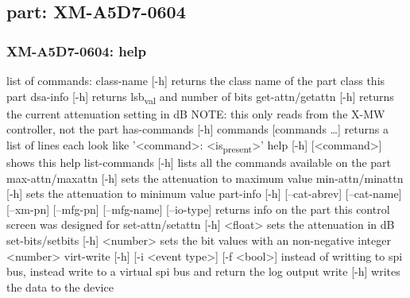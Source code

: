 \documentclass[11pt]{article}
\begin{document}
\subsection{part: XM-A5D7-0604}
\label{sec:orge544753}
\subsubsection{XM-A5D7-0604: help}
\label{sec:org00f37d2}
list of commands:
  class-name [-h]
    returns the class name of the part class this part
  dsa-info [-h]
    returns lsb\textsubscript{val} and number of bits
  get-attn/getattn [-h]
    returns the current attenuation setting in dB
    NOTE: this only reads from the X-MW controller, not the part
  has-commands [-h] commands [commands \ldots{}]
    returns a list of lines each look like '<command>: <is\textsubscript{present}>'
  help [-h] [<command>]
    shows this help
  list-commands [-h]
    lists all the commands available on the part
  max-attn/maxattn [-h]
    sets the attenuation to maximum value
  min-attn/minattn [-h]
    sets the attenuation to minimum value
  part-info  [-h] [--cat-abrev] [--cat-name] [--xm-pn] [--mfg-pn] [--mfg-name]
          [--io-type]
    returns info on the part this control screen was designed for
  set-attn/setattn [-h] <float>
    sets the attenuation in dB
  set-bits/setbits [-h] <number>
    sets the bit values with an non-negative integer <number>
  virt-write [-h] [-i <event type>] [-f <bool>]
    instead of writting to spi bus, instead write to a virtual spi bus
    and return the log output
  write [-h]
    writes the data to the device
\end{document}
